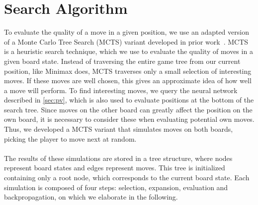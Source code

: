 \section{Search Algorithm}
To evaluate the quality of a move in a given position, we use an adapted version of a Monte Carlo Tree Search (MCTS) variant developed in prior work~\cite{alphazero}.
MCTS is a heuristic search technique, which we use to evaluate the quality of moves in a given board state.
Instead of traversing the entire game tree from our current position, like Minimax does, MCTS traverses only a small selection of interesting moves.
If these moves are well chosen, this gives an approximate idea of how well a move will perform.
To find interesting moves, we query the neural network described in \autoref{sec:pv}, which is also used to evaluate positions at the bottom of the search tree.
Since moves on the other board can greatly affect the position on the own board, it is necessary to consider these when evaluating potential own moves.
Thus, we developed a MCTS variant that simulates moves on both boards, picking the player to move next at random.
\\\\
The results of these simulations are stored in a tree structure, where nodes represent board states and edges represent moves.
This tree is initialized containing only a root node, which corresponds to the current board state.
Each simulation is composed of four steps: selection, expansion, evaluation and backpropagation, on which we elaborate in the following.

